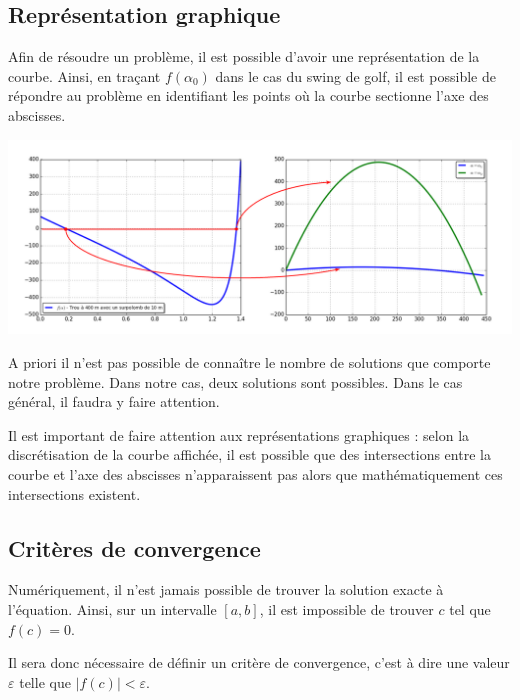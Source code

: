 \documentclass[10pt,fleqn]{article} %
\begin{document}
\subsection{Représentation graphique}

Afin de résoudre un problème, il est possible d'avoir une représentation de la courbe. Ainsi, en traçant $f(\alpha_0)$ dans le cas du swing de golf, il est possible de répondre au problème en identifiant les points où la courbe sectionne l'axe des abscisses. 

\begin{center}
\includegraphics[width=.9\textwidth]{images/InterpretationGraphique}
\end{center}

\begin{rem}
A priori il n'est pas possible de connaître le nombre de solutions que comporte notre problème. Dans notre cas, deux solutions sont possibles. Dans le cas général, il faudra y faire attention.
\end{rem}

\begin{warn}
Il est important de faire attention aux représentations graphiques : selon la discrétisation de la courbe affichée, il est possible que des intersections entre la courbe et l'axe des abscisses n'apparaissent pas alors que mathématiquement ces intersections existent. 
\end{warn}

\subsection{Critères de convergence}

Numériquement, il n'est jamais possible de trouver la solution exacte à l'équation. Ainsi, sur un intervalle $[a,b]$, il est impossible de trouver $c$ tel que $f(c)=0$.

Il sera donc nécessaire de définir un critère de convergence, c'est à dire une valeur $\varepsilon$ telle que $|f(c)|<\varepsilon$.
\end{document}
